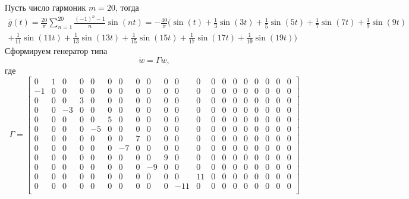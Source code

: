 Пусть число гармоник $m=20$, тогда
\begin{multline*}
    \bar g(t)=\frac{20}{\pi}\sum_{n=1}^{20}\frac{(-1)^n-1}{n}\sin(nt) 
    =-\frac{40}{\pi} \big(\sin(t) +\frac{1}{3} \sin(3 t) + \frac{1}{5} \sin(5 t) 
    + \frac{1}{7} \sin(7 t) + \frac{1}{9} \sin(9 t)\\ + \frac{1}{11} \sin(11 t) 
    + \frac{1}{13} \sin(13 t) + \frac{1}{15} \sin(15 t) + \frac{1}{17} \sin(17 t) 
    + \frac{1}{19} \sin(19 t)\big)
\end{multline*}
Сформируем генератор типа
\begin{equation*}
    \dot w=\Gamma w,
\end{equation*}
где
\begin{equation*}
    \Gamma=\begin{bmatrix}
        0  & 1  & 0  & 0  & 0  & 0  & 0  & 0  & 0  & 0  & 0  & 0  & 0  & 0  & 0  & 0  & 0  & 0  & 0  & 0 \\
       -1  & 0  & 0  & 0  & 0  & 0  & 0  & 0  & 0  & 0  & 0  & 0  & 0  & 0  & 0  & 0  & 0  & 0  & 0  & 0 \\
        0  & 0  & 0  & 3  & 0  & 0  & 0  & 0  & 0  & 0  & 0  & 0  & 0  & 0  & 0  & 0  & 0  & 0  & 0  & 0 \\
        0  & 0  &-3  & 0  & 0  & 0  & 0  & 0  & 0  & 0  & 0  & 0  & 0  & 0  & 0  & 0  & 0  & 0  & 0  & 0 \\
        0  & 0  & 0  & 0  & 0  & 5  & 0  & 0  & 0  & 0  & 0  & 0  & 0  & 0  & 0  & 0  & 0  & 0  & 0  & 0 \\
        0  & 0  & 0  & 0  &-5  & 0  & 0  & 0  & 0  & 0  & 0  & 0  & 0  & 0  & 0  & 0  & 0  & 0  & 0  & 0 \\
        0  & 0  & 0  & 0  & 0  & 0  & 0  & 7  & 0  & 0  & 0  & 0  & 0  & 0  & 0  & 0  & 0  & 0  & 0  & 0 \\
        0  & 0  & 0  & 0  & 0  & 0  &-7  & 0  & 0  & 0  & 0  & 0  & 0  & 0  & 0  & 0  & 0  & 0  & 0  & 0 \\
        0  & 0  & 0  & 0  & 0  & 0  & 0  & 0  & 0  & 9  & 0  & 0  & 0  & 0  & 0  & 0  & 0  & 0  & 0  & 0 \\
        0  & 0  & 0  & 0  & 0  & 0  & 0  & 0  &-9  & 0  & 0  & 0  & 0  & 0  & 0  & 0  & 0  & 0  & 0  & 0 \\
        0  & 0  & 0  & 0  & 0  & 0  & 0  & 0  & 0  & 0  & 0  & 11 & 0  & 0  & 0  & 0  & 0  & 0  & 0  & 0 \\
        0  & 0  & 0  & 0  & 0  & 0  & 0  & 0  & 0  & 0  &-11 & 0  & 0  & 0  & 0  & 0  & 0  & 0  & 0  & 0 \\

\end{bmatrix}
\end{equation*}
